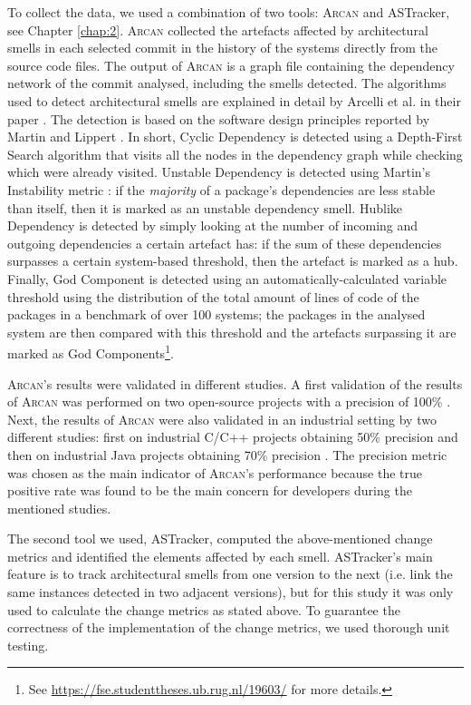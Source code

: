 To collect the data, we used a combination of two tools: \textsc{Arcan} \cite{Arcelli2016} and ASTracker, see Chapter \ref{chap:2}. \textsc{Arcan} collected the artefacts affected by architectural smells in each selected commit in the history of the systems directly from the source code files.
The output of \textsc{Arcan} is a graph file containing the dependency network of the commit analysed, including the smells detected.
The algorithms used to detect architectural smells are explained in detail by Arcelli et al. in their paper \cite{Arcelli2016}. The detection is based on the software design principles reported by Martin \cite{Martin2018} and Lippert \cite{Lippert2006}.
In short, Cyclic Dependency is detected using a Depth-First Search algorithm that visits all the nodes in the dependency graph while checking which were already visited. 
Unstable Dependency is detected using Martin's Instability metric \cite{Martin2018}: if the \emph{majority} of a package's  dependencies are less stable than itself, then it is marked as an unstable dependency smell.
Hublike Dependency is detected by simply looking at the number of incoming and outgoing dependencies a certain artefact has: if the sum of these dependencies surpasses a certain system-based threshold, then the artefact is marked as a hub.
Finally, God Component is detected using an automatically-calculated variable threshold \cite{Arcelli2015} using the distribution of the total amount of lines of code of the packages in a benchmark of over 100 systems; the packages in the analysed system are then compared with this threshold and the artefacts surpassing it are marked as God Components\footnote{See \url{https://fse.studenttheses.ub.rug.nl/19603/} for more details.}.

\textsc{Arcan}'s results were validated in different studies. A first validation of the results of \textsc{Arcan} was performed on two open-source projects with a precision of 100\% \cite{Arcelli2016}. 
Next, the results of \textsc{Arcan} were also validated in an industrial setting by two different studies: first on industrial C/C++ projects obtaining 50\% precision \cite{Martini2018} and then on industrial Java projects obtaining 70\% precision \cite{Arcelli2020}.
The precision metric was chosen as the main indicator of \textsc{Arcan}'s performance because the true positive rate was found to be the main concern for developers during the mentioned studies.

The second tool we used, ASTracker, computed the above-mentioned change metrics and identified the elements affected by each smell.
ASTracker's main feature is to track architectural smells from one version to the next (i.e. link the same instances detected in two adjacent versions), but for this study it was only used to calculate the change metrics as stated above. To guarantee the correctness of the implementation of the change metrics, we used thorough unit testing.

